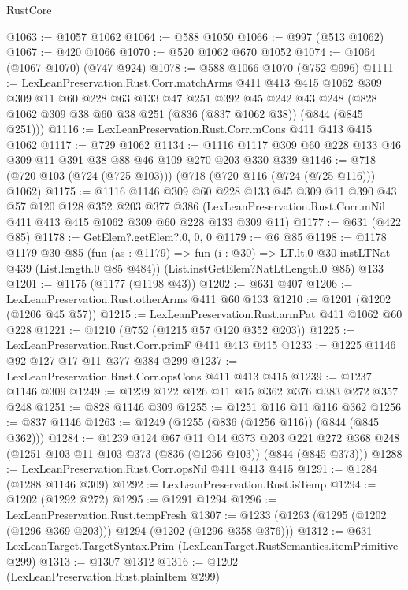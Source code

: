 \begin{lexlean}{RustCore}
\begin{coremodule}
@1063 := @1057 @1062
@1064 := @588 @1050
@1066 := @997 (@513 @1062)
@1067 := @420 @1066
@1070 := @520 @1062 @670 @1052
@1074 := @1064 (@1067 @1070) (@747 @924)
@1078 := @588 @1066 @1070 (@752 @996)
@1111 := LexLeanPreservation.Rust.Corr.matchArms
    @411
    @413
    @415
    @1062
    @309
    @309
    @11
    @60
    @228
    @63
    @133
    @47
    @251
    @392
    @45
    @242
    @43
    @248
    (@828 @1062 @309 @38 @60 @38 @251 (@836 (@837 @1062 @38)) (@844 (@845 @251)))
@1116 := LexLeanPreservation.Rust.Corr.mCons @411 @413 @415 @1062
@1117 := @729 @1062
@1134 := @1116 @1117 @309 @60 @228 @133 @46 @309 @11 @391 @38 @88 @46 @109 @270 @203 @330 @339
@1146 := @718 (@720 @103 (@724 (@725 @103))) (@718 (@720 @116 (@724 (@725 @116))) @1062)
@1175 := @1116
    @1146
    @309
    @60
    @228
    @133
    @45
    @309
    @11
    @390
    @43
    @57
    @120
    @128
    @352
    @203
    @377
    @386
    (LexLeanPreservation.Rust.Corr.mNil @411 @413 @415 @1062 @309 @60 @228 @133 @309 @11)
@1177 := @631 (@422 @85)
@1178 := GetElem?.getElem?.{0, 0, 0}
@1179 := @6 @85
@1198 := @1178
    @1179
    @30
    @85
    (fun (as : @1179) => fun (i : @30) => LT.lt.{0} @30 instLTNat @439 (List.length.{0} @85 @484))
    (List.instGetElem?NatLtLength.{0} @85)
    @133
@1201 := @1175 (@1177 (@1198 @43))
@1202 := @631 @407
@1206 := LexLeanPreservation.Rust.otherArms @411 @60 @133
@1210 := @1201 (@1202 (@1206 @45 @57))
@1215 := LexLeanPreservation.Rust.armPat @411 @1062 @60 @228
@1221 := @1210 (@752 (@1215 @57 @120 @352 @203))
@1225 := LexLeanPreservation.Rust.Corr.primF @411 @413 @415
@1233 := @1225 @1146 @92 @127 @17 @11 @377 @384 @299
@1237 := LexLeanPreservation.Rust.Corr.opsCons @411 @413 @415
@1239 := @1237 @1146 @309
@1249 := @1239 @122 @126 @11 @15 @362 @376 @383 @272 @357 @248
@1251 := @828 @1146 @309
@1255 := @1251 @116 @11 @116 @362
@1256 := @837 @1146
@1263 := @1249 (@1255 (@836 (@1256 @116)) (@844 (@845 @362)))
@1284 := @1239
    @124
    @67
    @11
    @14
    @373
    @203
    @221
    @272
    @368
    @248
    (@1251 @103 @11 @103 @373 (@836 (@1256 @103)) (@844 (@845 @373)))
@1288 := LexLeanPreservation.Rust.Corr.opsNil @411 @413 @415
@1291 := @1284 (@1288 @1146 @309)
@1292 := LexLeanPreservation.Rust.isTemp
@1294 := @1202 (@1292 @272)
@1295 := @1291 @1294
@1296 := LexLeanPreservation.Rust.tempFresh
@1307 := @1233 (@1263 (@1295 (@1202 (@1296 @369 @203))) @1294 (@1202 (@1296 @358 @376)))
@1312 := @631 LexLeanTarget.TargetSyntax.Prim (LexLeanTarget.RustSemantics.itemPrimitive @299)
@1313 := @1307 @1312
@1316 := @1202 (LexLeanPreservation.Rust.plainItem @299)

\end{coremodule}
\end{lexlean}
